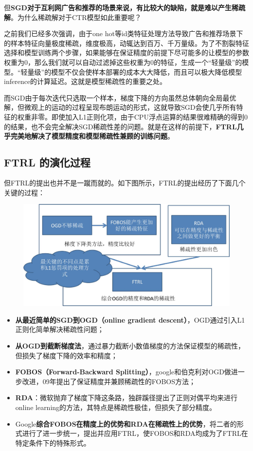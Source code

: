 \documentclass[12pt]{article}
\begin{document}
但\textbf{SGD对于互利网广告和推荐的场景来说，有比较大的缺陷，就是难以产生稀疏解}。为什么稀疏解对于CTR模型如此重要呢？

之前我们已经多次强调，由于one hot等id类特征处理方法导致广告和推荐场景下的样本特征向量极度稀疏，维度极高，动辄达到百万、千万量级。为了不割裂特征选择和模型训练两个步骤，如果能够在保证精度的前提下尽可能多的让模型的参数权重为0，那么我们就可以自动过滤掉这些权重为0的特征，生成一个“轻量级”的模型。“轻量级”的模型不仅会使样本部署的成本大大降低，而且可以极大降低模型inference的计算延迟。这就是模型稀疏性的重要之处。

而SGD由于每次迭代只选取一个样本，梯度下降的方向虽然总体朝向全局最优解，但微观上的运动的过程呈现布朗运动的形式，这就导致SGD会使几乎所有特征的权重非零。即使加入L1正则化项，由于CPU浮点运算的结果很难精确的得到0的结果，也不会完全解决SGD稀疏性差的问题。就是在这样的前提下，\textbf{FTRL几乎完美地解决了模型精度和模型稀疏性兼顾的训练问题}。

\subsection{FTRL 的演化过程}
但FTRL的提出也并不是一蹴而就的。如下图所示，FTRL的提出经历了下面几个关键的过程：
\begin{figure}[H]
    \centering
    \includegraphics[width=.6\textwidth]{fig/FTRL_Evolution.jpg}
\end{figure}

\begin{itemize}
\setlength{\itemsep}{0pt}
\setlength{\parsep}{0pt}
\setlength{\parskip}{0pt}
    \item \textbf{从最近简单的SGD到OGD（online gradient descent）}，OGD通过引入L1正则化简单解决稀疏性问题；
    \item \textbf{从OGD到截断梯度法}，通过暴力截断小数值梯度的方法保证模型的稀疏性，但损失了梯度下降的效率和精度；
    \item \textbf{FOBOS（Forward-Backward Splitting）}，google和伯克利对OGD做进一步改进，09年提出了保证精度并兼顾稀疏性的FOBOS方法；
    \item \textbf{RDA}：微软抛弃了梯度下降这条路，独辟蹊径提出了正则对偶平均来进行online learning的方法，其特点是稀疏性极佳，但损失了部分精度。
    \item Google\textbf{综合FOBOS在精度上的优势和RDA在稀疏性上的优势}，将二者的形式进行了进一步统一，提出并应用FTRL，使FOBOS和RDA均成为了FTRL在特定条件下的特殊形式。
\end{itemize}
\end{document}
